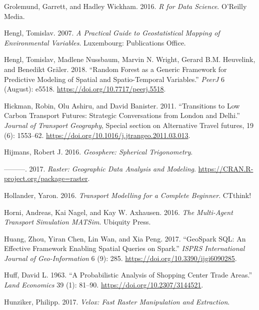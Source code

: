 \documentclass[]{krantz}
\begin{document}
\leavevmode\hypertarget{ref-grolemund_r_2016}{}%
Grolemund, Garrett, and Hadley Wickham. 2016. \emph{R for Data Science}. O'Reilly Media.

\leavevmode\hypertarget{ref-hengl_practical_2007}{}%
Hengl, Tomislav. 2007. \emph{A Practical Guide to Geostatistical Mapping of Environmental Variables}. Luxembourg: Publications Office.

\leavevmode\hypertarget{ref-hengl_random_2018}{}%
Hengl, Tomislav, Madlene Nussbaum, Marvin N. Wright, Gerard B.M. Heuvelink, and Benedikt Gräler. 2018. ``Random Forest as a Generic Framework for Predictive Modeling of Spatial and Spatio-Temporal Variables.'' \emph{PeerJ} 6 (August): e5518. \url{https://doi.org/10.7717/peerj.5518}.

\leavevmode\hypertarget{ref-hickman_transitions_2011}{}%
Hickman, Robin, Olu Ashiru, and David Banister. 2011. ``Transitions to Low Carbon Transport Futures: Strategic Conversations from London and Delhi.'' \emph{Journal of Transport Geography}, Special section on Alternative Travel futures, 19 (6): 1553--62. \url{https://doi.org/10.1016/j.jtrangeo.2011.03.013}.

\leavevmode\hypertarget{ref-hijmans_geosphere_2016}{}%
Hijmans, Robert J. 2016. \emph{Geosphere: Spherical Trigonometry}.

\leavevmode\hypertarget{ref-R-raster}{}%
---------. 2017. \emph{Raster: Geographic Data Analysis and Modeling}. \url{https://CRAN.R-project.org/package=raster}.

\leavevmode\hypertarget{ref-hollander_transport_2016}{}%
Hollander, Yaron. 2016. \emph{Transport Modelling for a Complete Beginner}. CTthink!

\leavevmode\hypertarget{ref-horni_multi-agent_2016}{}%
Horni, Andreas, Kai Nagel, and Kay W. Axhausen. 2016. \emph{The Multi-Agent Transport Simulation MATSim}. Ubiquity Press.

\leavevmode\hypertarget{ref-huang_geospark_2017}{}%
Huang, Zhou, Yiran Chen, Lin Wan, and Xia Peng. 2017. ``GeoSpark SQL: An Effective Framework Enabling Spatial Queries on Spark.'' \emph{ISPRS International Journal of Geo-Information} 6 (9): 285. \url{https://doi.org/10.3390/ijgi6090285}.

\leavevmode\hypertarget{ref-huff_probabilistic_1963}{}%
Huff, David L. 1963. ``A Probabilistic Analysis of Shopping Center Trade Areas.'' \emph{Land Economics} 39 (1): 81--90. \url{https://doi.org/10.2307/3144521}.

\leavevmode\hypertarget{ref-hunziker_velox:_2017}{}%
Hunziker, Philipp. 2017. \emph{Velox: Fast Raster Manipulation and Extraction}.
\end{document}
